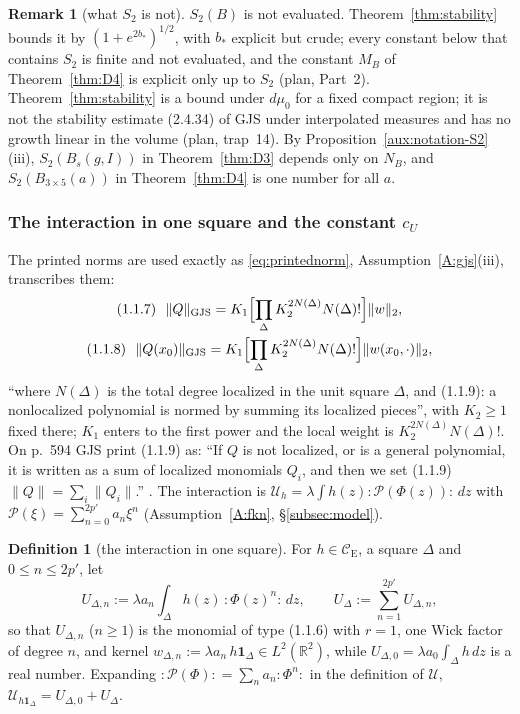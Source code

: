 \documentclass[11pt,a4paper]{article}
\theoremstyle{plain}
\theoremstyle{definition}
\theoremstyle{plain}
\theoremstyle{definition}
\newtheorem{auxdef}[auxlemma]{Definition}
\newtheorem{auxrem}[auxlemma]{Remark}
\newcommand{\R}{\mathbb{R}}
\newcommand{\CE}{\mathcal{C}_{\mathrm E}}
\newcommand{\GJS}[1]{\lVert #1\rVert_{\mathrm{GJS}}}   %
\newcommand{\Uc}{\mathcal U}
\newcommand{\dmu}{d\mu_0}
\begin{document}
\begin{auxrem}[what $S_2$ is not]\label{aux:notation-S2rem}
$S_2(B)$ is not evaluated.  Theorem~\ref{thm:stability} bounds it by
$(1+e^{2b_*})^{1/2}$, with $b_*$ explicit but crude; every constant below that contains $S_2$
is finite and not evaluated, and the constant $M_B$ of Theorem~\ref{thm:D4} is explicit only
up to $S_2$ (plan, Part~2).  Theorem~\ref{thm:stability} is a bound under $\dmu$ for
a fixed compact region; it is not the stability estimate (2.4.34) of GJS under interpolated
measures and has no growth linear in the volume (plan, trap~14).  By
Proposition~\ref{aux:notation-S2}(iii), $S_2(B_s(g,I))$ in Theorem~\ref{thm:D3} depends only
on $N_B$, and $S_2(B_{3\times5}(a))$ in Theorem~\ref{thm:D4} is one number for all $a$.
\end{auxrem}

\subsubsection{The interaction in one square and the constant $c_U$}\label{sec:notation-cU}

The printed norms are used exactly as \eqref{eq:printednorm},
Assumption~\ref{A:gjs}(iii), transcribes them:
\[
\begin{gathered}
 \text{(1.1.7)}\ \ \GJS{Q}=K_1\Bigl[\prod_\Delta K_2^{2N(\Delta)}N(\Delta)!\Bigr]\|w\|_2,\\
 \text{(1.1.8)}\ \ \GJS{Q(x_0)}=K_1\Bigl[\prod_\Delta K_2^{2N(\Delta)}N(\Delta)!\Bigr]\|w(x_0,\cdot)\|_2,
\end{gathered}
\]
``where $N(\Delta)$ is the total degree localized in the unit square $\Delta$, and (1.1.9): a
nonlocalized polynomial is normed by summing its localized pieces'', with $K_2\ge1$ fixed
there; $K_1$ enters to the first power and the local weight is $K_2^{2N(\Delta)}N(\Delta)!$.
On p.~594 GJS print (1.1.9) as: ``If $Q$ is not localized, or is a general polynomial, it is
written as a sum of localized monomials $Q_i$, and then we set (1.1.9) $\|Q\|=\sum_i\|Q_i\|$.''
\cite[p.~594]{GJS}.  The interaction is $\Uc_h=\lambda\int h(z){:}\mathscr P(\Phi(z)){:}\,dz$
with $\mathscr P(\xi)=\sum_{n=0}^{2p'}a_n\xi^n$ (Assumption~\ref{A:fkn}, \S\ref{subsec:model}).

\begin{auxdef}[the interaction in one square]\label{aux:notation-UDelta}
For $h\in\CE$, a square $\Delta$ and $0\le n\le2p'$, let
\[
 U_{\Delta,n}:=\lambda a_n\int_\Delta h(z)\,{:}\Phi(z)^n{:}\,dz ,\qquad
 U_\Delta:=\sum_{n=1}^{2p'}U_{\Delta,n} ,
\]
so that $U_{\Delta,n}$ ($n\ge1$) is the monomial of type (1.1.6) with $r=1$, one Wick factor
of degree $n$, and kernel $w_{\Delta,n}:=\lambda a_n\,h\mathbf 1_\Delta\in L^2(\R^2)$, while
$U_{\Delta,0}=\lambda a_0\int_\Delta h\,dz$ is a real number.  Expanding ${:}\mathscr
P(\Phi){:}=\sum_na_n{:}\Phi^n{:}$ in the definition of $\Uc$,
$\Uc_{h\mathbf 1_\Delta}=U_{\Delta,0}+U_\Delta$.
\end{auxdef}
\end{document}
